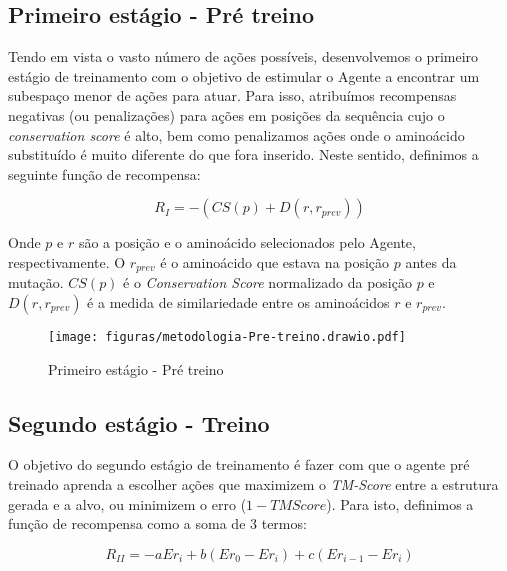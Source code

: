 \subsection{Primeiro estágio - Pré treino}

Tendo em vista o vasto número de ações possíveis, desenvolvemos o primeiro estágio de treinamento com o objetivo de estimular o Agente a encontrar um subespaço menor de ações para atuar. Para isso, atribuímos recompensas negativas (ou penalizações) para ações em posições da sequência cujo o \textit{conservation score} é alto, bem como penalizamos ações onde o aminoácido substituído é muito diferente do que fora inserido. 
Neste sentido, definimos a seguinte função de recompensa:

\begin{equation}
    R_{I} = -(CS(p) + D(r, r_{prev}))
\end{equation}

\noindent
Onde $p$ e $r$ são a posição e o aminoácido selecionados pelo Agente, respectivamente. O $r_{prev}$ é o aminoácido que estava na posição $p$ antes da mutação. $CS(p)$ é o \textit{Conservation Score} normalizado da posição $p$ e $D(r, r_{prev})$ é a medida de similariedade entre os aminoácidos $r$ e $r_{prev}$. 

\begin{figure}[H]
  \centering
  \texttt{[image: figuras/metodologia-Pre-treino.drawio.pdf]}
  \caption{Primeiro estágio - Pré treino}
\end{figure}

\subsection{Segundo estágio - Treino}
O objetivo do segundo estágio de treinamento é fazer com que o agente pré treinado aprenda a escolher ações que maximizem o \textit{TM-Score} entre a estrutura gerada e a alvo, ou minimizem o erro ($1-TMScore$).
Para isto, definimos a função de recompensa como a soma de 3 termos: 

\begin{equation}
    R_{II} = -aEr_{i} + b(Er_{0} - Er_{i}) + c(Er_{i-1} - Er_{i})
\end{equation}

